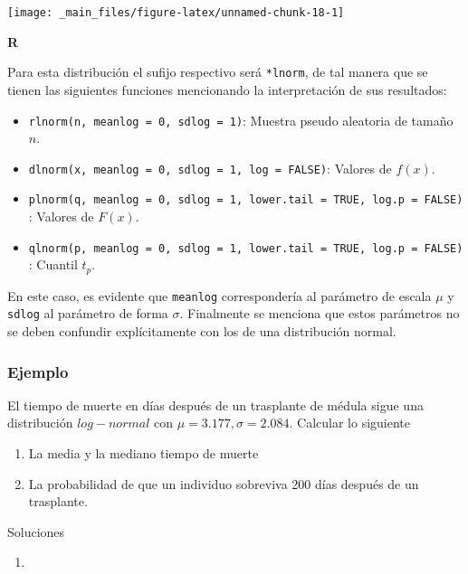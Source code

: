 \documentclass[
  a4paper,
  oneside,
  openany]{book}
\providecommand{\tightlist}{%
  \setlength{\itemsep}{0pt}\setlength{\parskip}{0pt}}
\begin{document}
\begin{center}\texttt{[image: \_main\_files/figure-latex/unnamed-chunk-18-1]} \end{center}

\textbf{R}

Para esta distribución el sufijo respectivo será \texttt{*lnorm}, de tal manera que se tienen las siguientes funciones mencionando la interpretación de sus resultados:

\begin{itemize}
\tightlist
\item
  \texttt{rlnorm(n,\ meanlog\ =\ 0,\ sdlog\ =\ 1)}: Muestra pseudo aleatoria de tamaño \(n\).
\item
  \texttt{dlnorm(x,\ meanlog\ =\ 0,\ sdlog\ =\ 1,\ log\ =\ FALSE)}: Valores de \(f(x)\).
\item
  \texttt{plnorm(q,\ meanlog\ =\ 0,\ sdlog\ =\ 1,\ lower.tail\ =\ TRUE,\ log.p\ =\ FALSE)}: Valores de \(F(x)\).
\item
  \texttt{qlnorm(p,\ meanlog\ =\ 0,\ sdlog\ =\ 1,\ lower.tail\ =\ TRUE,\ log.p\ =\ FALSE)}: Cuantil \(t_p\).
\end{itemize}

En este caso, es evidente que \texttt{meanlog} correspondería al parámetro de escala \(\mu\) y \texttt{sdlog} al parámetro de forma \(\sigma\). Finalmente se menciona que estos parámetros no se deben confundir explícitamente con los de una distribución normal.

\hypertarget{ejemplo-6}{%
\subsubsection*{Ejemplo}\label{ejemplo-6}}


El tiempo de muerte en días después de un trasplante de médula sigue una distribución \(log-normal\) con \(\mu = 3.177, \sigma = 2.084\). Calcular lo siguiente

\begin{enumerate}
\def\labelenumi{\arabic{enumi}.}
\tightlist
\item
  La media y la mediano tiempo de muerte
\item
  La probabilidad de que un individuo sobreviva 200 días después de un trasplante.
\end{enumerate}

Soluciones

\begin{enumerate}
\def\labelenumi{\arabic{enumi}.}
\tightlist
\item
\end{enumerate}
\end{document}

